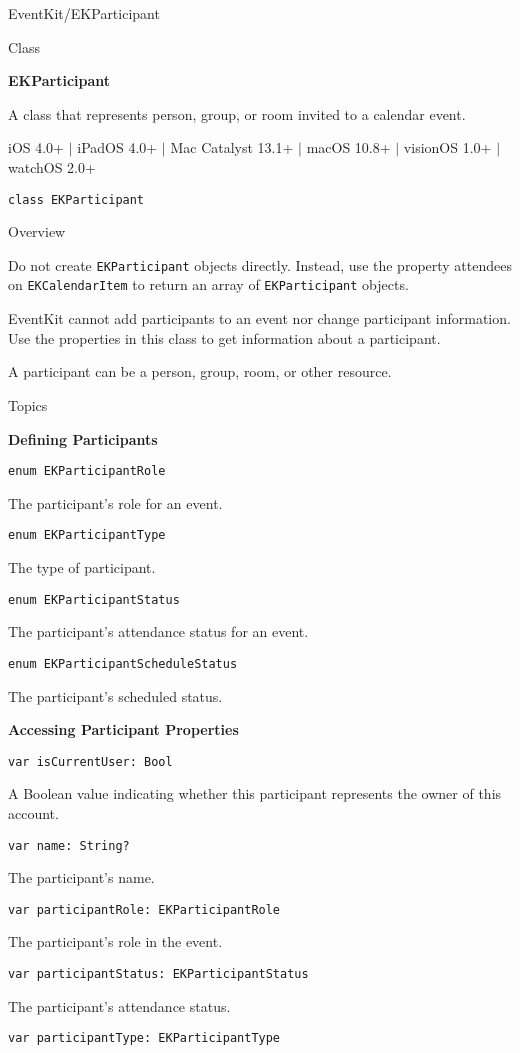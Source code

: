 \documentclass{article}
\title{}
\author{}
\date{}
\begin{document}
EventKit/EKParticipant

Class

\textbf{EKParticipant}

A class that represents person, group, or room invited to a calendar event.

iOS 4.0+ $|$ iPadOS 4.0+ $|$ Mac Catalyst 13.1+ $|$ macOS 10.8+ $|$ visionOS 1.0+ $|$ watchOS 2.0+

\texttt{class EKParticipant}

Overview

Do not create \texttt{EKParticipant} objects directly. Instead, use the property attendees on \texttt{EKCalendarItem} to return an array of \texttt{EKParticipant} objects.

EventKit cannot add participants to an event nor change participant information. Use the properties in this class to get information about a participant.

A participant can be a person, group, room, or other resource.

Topics

\textbf{Defining Participants}

\texttt{enum EKParticipantRole}

The participant's role for an event.

\texttt{enum EKParticipantType}

The type of participant.

\texttt{enum EKParticipantStatus}

The participant's attendance status for an event.

\texttt{enum EKParticipantScheduleStatus}

The participant's scheduled status.

\textbf{Accessing Participant Properties}

\texttt{var isCurrentUser: Bool}

A Boolean value indicating whether this participant represents the owner of this account.

\texttt{var name: String?}

The participant's name.

\texttt{var participantRole: EKParticipantRole}

The participant's role in the event.

\texttt{var participantStatus: EKParticipantStatus}

The participant's attendance status.

\texttt{var participantType: EKParticipantType}
\end{document}
